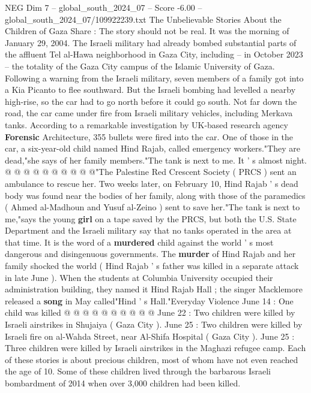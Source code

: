 \begin{textsample}{NEG Dim 7 – global\_south\_2024\_07 – Score -6.00 – global\_south\_2024\_07/109922239.txt}  \label{ex:f7_neg_334}
The Unbelievable Stories About the Children of Gaza Share : The story should not be real.
It was the morning of January 29, 2004.
The Israeli military had already bombed substantial parts of the affluent Tel al-Hawa neighborhood in Gaza City, including -- in October 2023 -- the totality of the Gaza City campus of the Islamic University of Gaza.
Following a warning from the Israeli military, seven members of a family got into a Kia Picanto to flee southward.
But the Israeli bombing had levelled a nearby high-rise, so the car had to go north before it could go south.
Not far down the road, the car came under fire from Israeli military vehicles, including Merkava tanks.
According to a remarkable investigation by UK-based research agency \textbf{Forensic} Architecture, 355 bullets were fired into the car.
One of those in the car, a six-year-old child named Hind Rajab, called emergency workers."They are dead,"she says of her family members."The tank is next to me.
It ' s almost night. @ @ @ @ @ @ @ @ @ @"The Palestine Red Crescent Society ( PRCS ) sent an ambulance to rescue her.
Two weeks later, on February 10, Hind Rajab ' s dead body was found near the bodies of her family, along with those of the paramedics ( Ahmed al-Madhoun and Yusuf al-Zeino ) sent to save her."The tank is next to me,"says the young \textbf{girl} on a tape saved by the PRCS, but both the U.S.
State Department and the Israeli military say that no tanks operated in the area at that time.
It is the word of a \textbf{murdered} child against the world ' s most dangerous and disingenuous governments.
The \textbf{murder} of Hind Rajab and her family shocked the world ( Hind Rajab ' s father was killed in a separate attack in late June ).
When the students at Columbia University occupied their administration building, they named it Hind Rajab Hall ; the singer Macklemore released a \textbf{song} in May called"Hind ' s Hall."Everyday Violence June 14 : One child was killed @ @ @ @ @ @ @ @ @ @ June 22 : Two children were killed by Israeli airstrikes in Shujaiya ( Gaza City ).
June 25 : Two children were killed by Israeli fire on al-Wahda Street, near Al-Shifa Hospital ( Gaza City ).
June 25 : Three children were killed by Israeli airstrikes in the Maghazi refugee camp.
Each of these stories is about precious children, most of whom have not even reached the age of 10.
Some of these children lived through the barbarous Israeli bombardment of 2014 when over 3,000 children had been killed.

\end{textsample}
